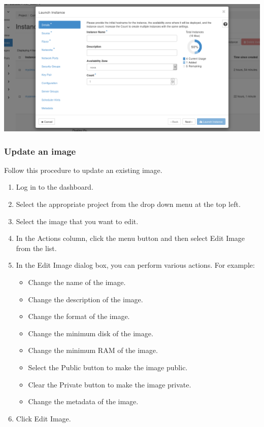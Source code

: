 \begin{center}
\includegraphics[scale=0.5]{img/tab-compute-instances-launch.png}
\end{center}

\subsubsection{Update an image}

Follow this procedure to update an existing image.

\begin{enumerate}
\item    Log in to the dashboard.
\item Select the appropriate project from the drop down menu at the
  top left.
\item    Select the image that you want to edit.
\item In the Actions column, click the menu button and then select
  Edit Image from the list.
\item In the Edit Image dialog box, you can perform various
  actions. For example:
  \begin{itemize}
  \item    Change the name of the image.
  \item    Change the description of the image.
  \item    Change the format of the image.
  \item    Change the minimum disk of the image.
  \item    Change the minimum RAM of the image.
  \item    Select the Public button to make the image public.
  \item    Clear the Private button to make the image private.
  \item    Change the metadata of the image.
  \end{itemize}
\item  Click Edit Image.
\end{enumerate}

